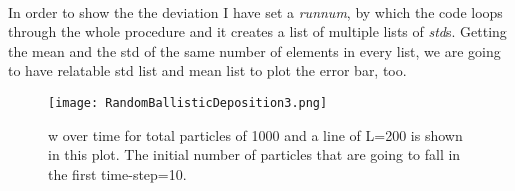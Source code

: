 \documentclass[12pt,a4paper]{article}
\begin{document}
\paragraph*{} In order to show the the deviation I have set a \textit{run\underline{\hspace{.05in}}num}, by which the code loops through the whole procedure and it creates a list of multiple lists of \textit{std}s. Getting the mean and the std of the same number of elements in every list, we are going to have relatable std list and mean list to plot the error bar, too. 

\begin{figure}[H]
	\centering
	\texttt{[image: RandomBallisticDeposition3.png]}
	\label{fig:mesh3}
	\caption{w over time for total particles of 1000 and a line of L=200 is shown in this plot. The initial number of particles that are going to fall in the first time-step=10.}
\end{figure}
\end{document}
